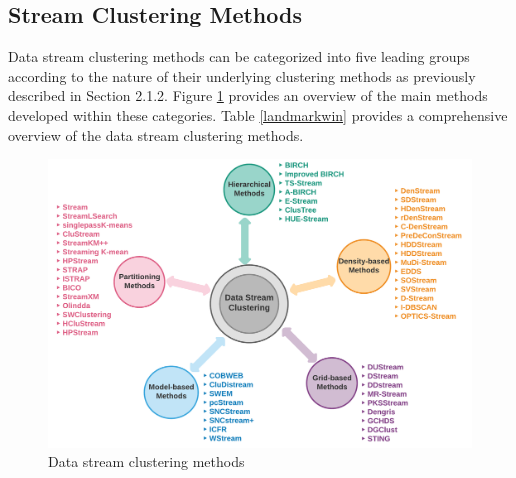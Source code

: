 \hspace{}

\subsection{Stream Clustering Methods}

Data stream clustering methods can be categorized into five leading groups according to the nature of their underlying clustering methods as previously described in Section 2.1.2. Figure \ref{method} provides an overview of the main methods developed within these categories. Table \ref{landmarkwin} provides a comprehensive overview of the data stream clustering methods. 


\begin{figure}
\centering
\includegraphics[width = 12 cm]{image/Chapters/Chapter2/streammethod.png}
\caption{Data stream clustering methods}
\label{method}
\end{figure}









